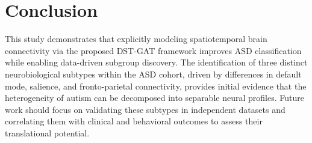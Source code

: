 \documentclass[10pt]{article}
\begin{document}
\section{Conclusion}
This study demonstrates that explicitly modeling spatiotemporal brain connectivity via the proposed DST-GAT framework improves ASD classification while enabling data-driven subgroup discovery. The identification of three distinct neurobiological subtypes within the ASD cohort, driven by differences in default mode, salience, and fronto-parietal connectivity, provides initial evidence that the heterogeneity of autism can be decomposed into separable neural profiles. Future work should focus on validating these subtypes in independent datasets and correlating them with clinical and behavioral outcomes to assess their translational potential.

\nocite{*}
\printbibliography
\end{document}
